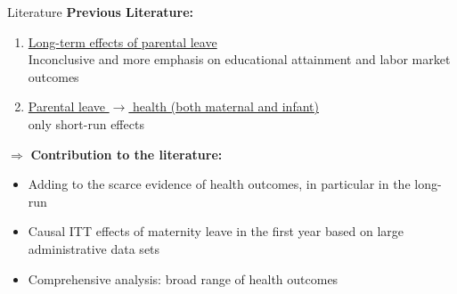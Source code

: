 \documentclass{beamer} %
\begin{document}
\begin{frame}{Literature}
\textbf{Previous Literature:}
\begin{enumerate}
\item \underline{Long-term effects of parental leave}\\ Inconclusive and more emphasis on educational attainment and labor market outcomes
\item \underline{Parental leave $\rightarrow$ health (both maternal and infant)} \\only short-run effects
\end{enumerate}\pause
\bigskip
$\Rightarrow$ \textbf{Contribution to the literature:}
\begin{itemize}
\item Adding to the scarce evidence of health outcomes, in particular in the long-run

\item Causal ITT effects of maternity leave in the first year based on large administrative data sets

\item Comprehensive analysis: broad range of health outcomes 



\end{itemize}
\end{frame}



\end{document}
